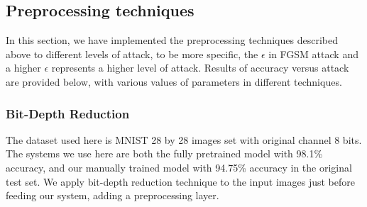\subsection{Preprocessing techniques}
In this section, we have implemented the preprocessing techniques described above to different levels of attack, to be more specific, the $\epsilon$ in FGSM attack and a higher $\epsilon$ represents a higher level of attack. Results of accuracy versus attack are provided below, with various values of parameters in different techniques.

\subsubsection{Bit-Depth Reduction}
The dataset used here is MNIST 28 by 28 images set with original channel 8 bits. The systems we use here are both the fully pretrained model with 98.1\% accuracy, and our manually trained model with 94.75\% accuracy in the original test set. We apply bit-depth reduction technique to the input images just before feeding our system, adding a preprocessing layer. 
